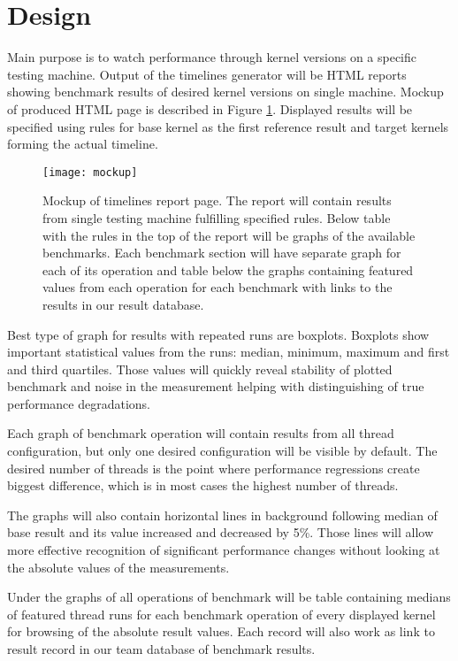 \section{Design}
Main purpose is to watch performance through kernel versions on a specific testing
machine. Output of the timelines generator will be HTML reports showing
benchmark results of desired kernel versions on single machine. Mockup of
produced HTML page is described in Figure \ref{fig:mockup}. Displayed results
will be specified using rules for base kernel as the first reference result
and target kernels forming the actual timeline.

\begin{figure}
  \centering
  \texttt{[image: mockup]}
  \caption{Mockup of timelines report page. The report will contain results from
    single testing machine fulfilling specified rules. Below table with the rules
    in the top of the report will be graphs of the available benchmarks. Each
    benchmark section will have separate graph for each of its operation and table
    below the graphs containing featured values from each operation for each
    benchmark with links to the results in our result database.}
  \label{fig:mockup}
\end{figure}

Best type of graph for results with repeated runs are boxplots. Boxplots show
important statistical values from the runs: median, minimum, maximum and first
and third quartiles. Those values will quickly reveal stability of plotted
benchmark and noise in the measurement helping with distinguishing of true
performance degradations.

Each graph of benchmark operation will contain results from all thread
configuration, but only one desired configuration will be visible by default.
The desired number of threads is the point where performance regressions create
biggest difference, which is in most cases the highest number of threads.

The graphs will also contain horizontal lines in background following median of
base result and its value increased and decreased by 5\%. Those lines will allow
more effective recognition of significant performance changes without looking at
the absolute values of the measurements.

Under the graphs of all operations of benchmark will be table containing medians
of featured thread runs for each benchmark operation of every displayed kernel
for browsing of the absolute result values. Each record will also work as link
to result record in our team database of benchmark results.

